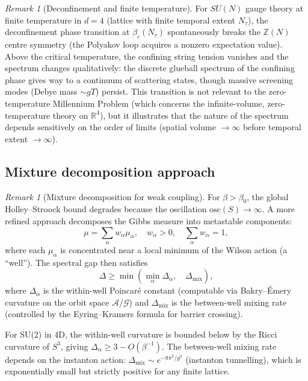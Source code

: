 \documentclass[12pt,a4paper]{article}
\theoremstyle{definition}
\theoremstyle{plain}
\theoremstyle{remark}
\newtheorem{remark}[definition]{Remark}
\begin{document}
\begin{remark}[Deconfinement and finite temperature]
For $SU(N)$ gauge theory at finite temperature in $d = 4$ (lattice with finite temporal extent $N_\tau$), the deconfinement phase transition at $\beta_c(N_\tau)$ spontaneously breaks the $\mathbb{Z}(N)$ centre symmetry (the Polyakov loop acquires a nonzero expectation value). Above the critical temperature, the confining string tension vanishes and the spectrum changes qualitatively: the discrete glueball spectrum of the confining phase gives way to a continuum of scattering states, though massive screening modes (Debye mass $\sim gT$) persist. This transition is not relevant to the zero-temperature Millennium Problem (which concerns the infinite-volume, zero-temperature theory on $\mathbb{R}^4$), but it illustrates that the nature of the spectrum depends sensitively on the order of limits (spatial volume $\to \infty$ before temporal extent $\to \infty$).
\end{remark}

\subsection{Mixture decomposition approach}

\begin{remark}[Mixture decomposition for weak coupling]
\label{rem:mixture-decomposition}
For $\beta > \beta_0$, the global Holley--Stroock bound degrades because the oscillation $\mathrm{osc}(S) \to \infty$. A more refined approach decomposes the Gibbs measure into metastable components:
\[
\mu = \sum_{\alpha} w_\alpha \mu_\alpha, \quad w_\alpha > 0, \quad \sum_\alpha w_\alpha = 1,
\]
where each $\mu_\alpha$ is concentrated near a local minimum of the Wilson action (a ``well''). The spectral gap then satisfies
\[
\Delta \geq \min\left( \min_\alpha \Delta_\alpha, \quad \Delta_{\mathrm{mix}} \right),
\]
where $\Delta_\alpha$ is the within-well Poincar\'e constant (computable via Bakry--\'Emery curvature on the orbit space $\mathcal{A}/\mathcal{G}$) and $\Delta_{\mathrm{mix}}$ is the between-well mixing rate (controlled by the Eyring--Kramers formula for barrier crossing).

For SU(2) in 4D, the within-well curvature is bounded below by the Ricci curvature of $S^3$, giving $\Delta_\alpha \geq 3 - O(\beta^{-1})$. The between-well mixing rate depends on the instanton action: $\Delta_{\mathrm{mix}} \sim e^{-8\pi^2/g^2}$ (instanton tunnelling), which is exponentially small but strictly positive for any finite lattice.
\end{remark}
\end{document}
